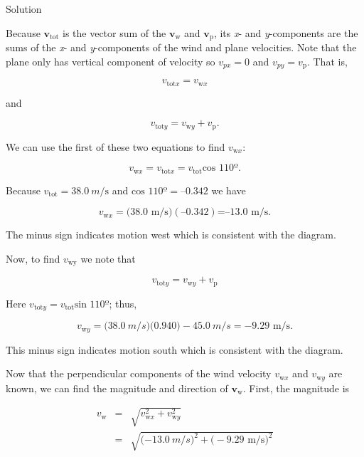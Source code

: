 \documentclass[
]{book}
\begin{document}
{Solution}

Because \(\textbf{v}_{\text{tot}}{}\) is the vector sum of the
\(\textbf{v}_{\text{w}}{}\) and \(\textbf{v}_{\text{p}}{}\), its \emph{x}- and
\emph{y}-components are the sums of the \emph{x}- and \emph{y}-components of the wind
and plane velocities. Note that the plane only has vertical component of
velocity so \({v_{px} = 0}{}\) and \({v_{py} = v_{\text{p}}}{}\). That is,

\leavevmode{}%
\[{v_{\text{tot}x} = v_{\text{w}x}}{}\]

and

\leavevmode{}%
\[{{v_{\text{tot}y} = {v_{\text{w}y} + v_{\text{p}}}}\text{.}}{}\]

We can use the first of these two equations to find \(v_{\text{w}x}{}\):

\leavevmode{}%
\[{{{{v_{\text{w}x} = v_{\text{tot}x}} = v_{\text{tot}}}\text{cos\ 110º}}\text{.}}{}\]

Because \({v_{\text{tot}} = \text{38}}\text{.}{0\ m/\text{s}}\) and
\({\text{cos\ 110º} = –0.342}{}\) we have

\leavevmode{}%
\[{{v_{\text{w}x} = (}\text{38}\text{.}\text{0\ m/s})(\text{–0}\text{.}\text{342})\text{=–13}\text{.}\text{0\ m/s.}}{}\]

The minus sign indicates motion west which is consistent with the
diagram.

Now, to find \(v_{\text{w}\text{y}}{}\) we note that

\leavevmode{}%
\[{v_{\text{tot}y} = {v_{\text{w}y} + v_{\text{p}}}}{}\]

Here \({{{v_{\text{tot}y} =}v_{\text{tot}}}\text{sin~110º}}{}\); thus,

\leavevmode{}%
\[{{v_{\text{w}y} = (}\text{38}\text{.}0\ m/s)(0\text{.}\text{940}{) - \text{45}}\text{.}0\ m/s{= {- 9}}\text{.}\text{29\ m/s.}}{}\]

This minus sign indicates motion south which is consistent with the
diagram.

Now that the perpendicular components of the wind velocity
\(v_{\text{w}x}{}\) and \(v_{\text{w}y}{}\) are known, we can find the
magnitude and direction of \(\textbf{v}_{\text{w}}{}\). First, the
magnitude is

\leavevmode{}%
\[\begin{array}{lll}
v_{\text{w}} & = & \sqrt{v_{\text{w}x}^{2} + v_{\text{w}y}^{2}} \\
 & = & \sqrt{{( - \text{13}}\text{.}0\ m/s{{)^{2} + (} - 9}\text{.}\text{29\ m/s})^{2}} \\
\end{array}\]
\end{document}
